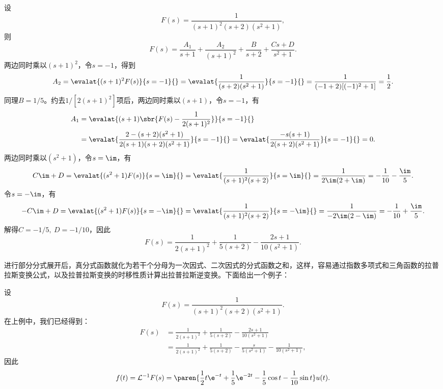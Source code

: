 \begin{example}\label{exmp:partial_fraction}
    设
    \begin{equation}
        F(s)=\frac{1}{(s+1)^2(s+2)(s^2+1)},
    \end{equation}
    则
    \begin{equation}
        F(s)=\frac{A_1}{s+1}+\frac{A_2}{(s+1)^2}+\frac{B}{s+2}+\frac{Cs+D}{s^2+1}.
    \end{equation}
    两边同时乘以$(s+1)^2$，令$s=-1$，得到
    \begin{equation}
        A_2=\evalat{(s+1)^2 F(s)}{s=-1}{}=\evalat{\frac{1}{(s+2)(s^2+1)}}{s=-1}{}=\frac{1}{(-1+2)[(-1)^2+1]}=\frac{1}{2}.
    \end{equation}
    同理$B=1/5$。约去$1/[2(s+1)^2]$项后，两边同时乘以$(s+1)$，令$s=-1$，有
    \begin{align}
        A_1&=\evalat{(s+1)\sbr{F(s)-\frac{1}{2(s+1)^2}}}{s=-1}{}\nonumber\\
        &=\evalat{\frac{2-(s+2)(s^2+1)}{2(s+1)(s+2)(s^2+1)}}{s=-1}{}=\evalat{\frac{-s(s+1)}{2(s+2)(s^2+1)}}{s=-1}{}=0.
    \end{align}
    两边同时乘以$(s^2+1)$，令$s=\im$，有
    \begin{equation}
        C\im+D=\evalat{(s^2+1)F(s)}{s=\im}{}=\evalat{\frac{1}{(s+1)^2(s+2)}}{s=\im}{}=\frac{1}{2\im(2+\im)}=-\frac{1}{10}-\frac{\im}{5}.
    \end{equation}
    令$s=-\im$，有
    \begin{equation}
        -C\im+D=\evalat{(s^2+1)F(s)}{s=-\im}{}=\evalat{\frac{1}{(s+1)^2(s+2)}}{s=-\im}{}=\frac{1}{-2\im(2-\im)}=-\frac{1}{10}+\frac{\im}{5}.
    \end{equation}
    解得$C=-1/5,\ D=-1/10$，因此
    \begin{equation}
        F(s)=\frac{1}{2(s+1)^2}+\frac{1}{5(s+2)}-\frac{2s+1}{10(s^2+1)}.
    \end{equation}
\end{example}

进行部分分式展开后，真分式函数就化为若干个分母为一次因式、二次因式的分式函数之和，这样，容易通过指数多项式和三角函数的拉普拉斯变换公式，以及拉普拉斯变换的时移性质计算出拉普拉斯逆变换。下面给出一个例子：
\begin{example}[部分分式展开法求拉普拉斯逆变换]
    设
    \begin{equation}
        F(s)=\frac{1}{(s+1)^2(s+2)(s^2+1)}.
    \end{equation}
    在上例中，我们已经得到：
    \begin{align}
        F(s)&=\frac{1}{2(s+1)^2}+\frac{1}{5(s+2)}-\frac{2s+1}{10(s^2+1)}\nonumber\\
        &=\frac{1}{2(s+1)^2}+\frac{1}{5(s+2)}-\frac{s}{5(s^2+1)}-\frac{1}{10(s^2+1)},
    \end{align}
    因此
    \begin{equation}
        f(t)=\mathcal{L}^{-1}F(s)=\paren{\frac{1}{2}t\e^{-t}+\frac{1}{5}\e^{-2t}-\frac{1}{5}\cos t-\frac{1}{10}\sin t}u(t).
    \end{equation}
\end{example}

